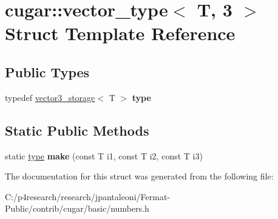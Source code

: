 \hypertarget{structcugar_1_1vector__type_3_01_t_00_013_01_4}{}\section{cugar\+:\+:vector\+\_\+type$<$ T, 3 $>$ Struct Template Reference}
\label{structcugar_1_1vector__type_3_01_t_00_013_01_4}
\subsection*{Public Types}
\begin{DoxyCompactItemize}
\item 
\mbox{\label{structcugar_1_1vector__type_3_01_t_00_013_01_4_acb8b01b798adda3943ae4d9d198e4ac9}} 
typedef \hyperlink{structcugar_1_1vector3__storage}{vector3\+\_\+storage}$<$ T $>$ {\bfseries type}
\end{DoxyCompactItemize}
\subsection*{Static Public Methods}
\begin{DoxyCompactItemize}
\item 
\mbox{\label{structcugar_1_1vector__type_3_01_t_00_013_01_4_a1f4ffdf6a646833b82c0a42b7d92fa99}} 
static \hyperlink{structcugar_1_1vector3__storage}{type} {\bfseries make} (const T i1, const T i2, const T i3)
\end{DoxyCompactItemize}


The documentation for this struct was generated from the following file\+:\begin{DoxyCompactItemize}
\item 
C\+:/p4research/research/jpantaleoni/\+Fermat-\/\+Public/contrib/cugar/basic/numbers.\+h\end{DoxyCompactItemize}
